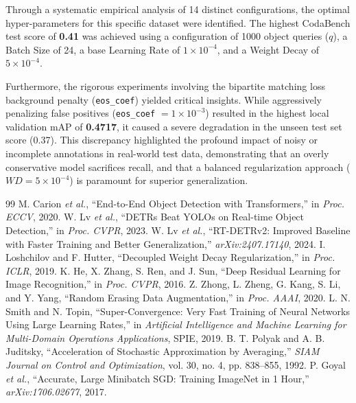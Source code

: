 \documentclass[12pt, a4paper]{article}
\begin{document}
Through a systematic empirical analysis of 14 distinct configurations, the optimal hyper-parameters for this specific dataset were identified. The highest CodaBench test score of \textbf{0.41} was achieved using a configuration of 1000 object queries ($q$), a Batch Size of 24, a base Learning Rate of $1 \times 10^{-4}$, and a Weight Decay of $5 \times 10^{-4}$.

Furthermore, the rigorous experiments involving the bipartite matching loss background penalty (\texttt{eos\_coef}) yielded critical insights. While aggressively penalizing false positives (\texttt{eos\_coef} $= 1 \times 10^{-3}$) resulted in the highest local validation mAP of \textbf{0.4717}, it caused a severe degradation in the unseen test set score (0.37). This discrepancy highlighted the profound impact of noisy or incomplete annotations in real-world test data, demonstrating that an overly conservative model sacrifices recall, and that a balanced regularization approach ($WD=5 \times 10^{-4}$) is paramount for superior generalization.

\newpage
\begin{thebibliography}{99}
 M. Carion \emph{et al.}, ``End-to-End Object Detection with Transformers,'' in \textit{Proc. ECCV}, 2020.
 W. Lv \emph{et al.}, ``DETRs Beat YOLOs on Real-time Object Detection,'' in \textit{Proc. CVPR}, 2023.
 W. Lv \emph{et al.}, ``RT-DETRv2: Improved Baseline with Faster Training and Better Generalization,'' \textit{arXiv:2407.17140}, 2024.
 I. Loshchilov and F. Hutter, ``Decoupled Weight Decay Regularization,'' in \textit{Proc. ICLR}, 2019.
 K. He, X. Zhang, S. Ren, and J. Sun, ``Deep Residual Learning for Image Recognition,'' in \textit{Proc. CVPR}, 2016.
 Z. Zhong, L. Zheng, G. Kang, S. Li, and Y. Yang, ``Random Erasing Data Augmentation,'' in \textit{Proc. AAAI}, 2020.
 L. N. Smith and N. Topin, ``Super-Convergence: Very Fast Training of Neural Networks Using Large Learning Rates,'' in \textit{Artificial Intelligence and Machine Learning for Multi-Domain Operations Applications}, SPIE, 2019.
 B. T. Polyak and A. B. Juditsky, ``Acceleration of Stochastic Approximation by Averaging,'' \textit{SIAM Journal on Control and Optimization}, vol. 30, no. 4, pp. 838--855, 1992.
 P. Goyal \emph{et al.}, ``Accurate, Large Minibatch SGD: Training ImageNet in 1 Hour,'' \textit{arXiv:1706.02677}, 2017.
\end{thebibliography}
\end{document}
